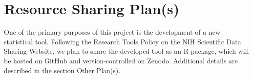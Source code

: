 \documentclass[12pt, class=article, crop=false]{standalone}
\begin{document}
\section*{Resource Sharing Plan(s)}

One of the primary purposes of this project is the development of a new statistical tool.
Following the Research Tools Policy on the NIH Scientific Data Sharing Website, we plan to share the developed tool as an R package, which will be hosted on GitHub and version-controlled on Zenodo.
Additional details are described in the section Other Plan(s).
\end{document}
